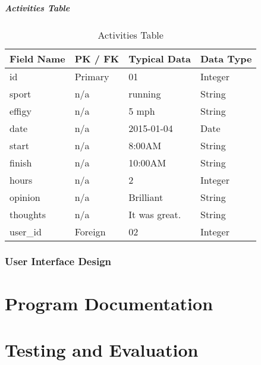 \documentclass{article}[12pt,a4paper]
\begin{document}
\subsubsection{Activities Table}

\begin{table}[h]
\begin{tabular}{|l|l|l|l|}
\hline
\textbf{Field Name} & \textbf{PK / FK} & \textbf{Typical Data} & \textbf{Data Type} \\ \hline
id                  & Primary          & 01                    & Integer            \\ \hline
sport               & n/a              & running               & String             \\ \hline
effigy              & n/a              & 5 mph                 & String             \\ \hline
date                & n/a              & 2015-01-04            & Date               \\ \hline
start               & n/a              & 8:00AM                & String             \\ \hline
finish              & n/a              & 10:00AM               & String             \\ \hline
hours               & n/a              & 2                     & Integer            \\ \hline
opinion             & n/a              & Brilliant             & String             \\ \hline
thoughts            & n/a              & It was great.         & String             \\ \hline
user\_id            & Foreign          & 02                    & Integer            \\ \hline
\end{tabular}
\caption{Activities Table}
\end{table}

\section{User Interface Design}

\cleardoublepage


\part{Program Documentation}


\cleardoublepage


\part{Testing and Evaluation}

\end{document}
